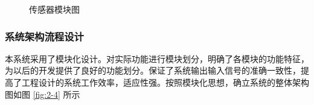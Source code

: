 \begin{figure}[htbp]
	\centering
	\caption{传感器模块图}
	\label{fig:2-3}
\end{figure}



\subsubsection{系统架构流程设计}

本系统采用了模块化设计。对实际功能进行模块划分，明确了各模块的功能特征，为以后的开发提供了良好的功能划分。保证了系统输出输入信号的准确一致性，提高了工程设计的系统工作效率，适应性强。按照模块化思想，确立系统的整体架构图如图 \ref{fig:2-4} 所示

